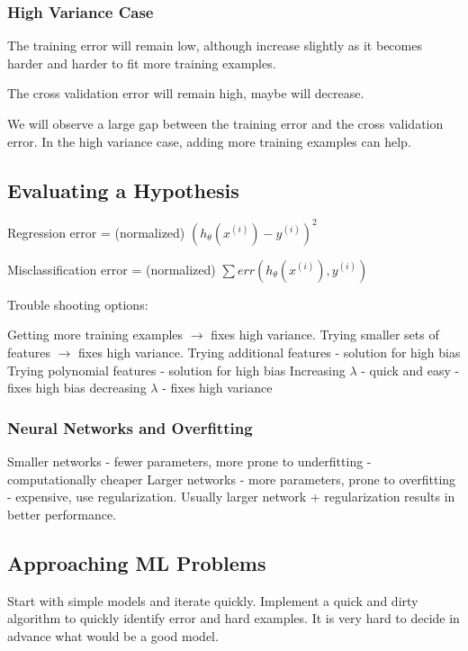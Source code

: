 \subsubsection{High Variance Case}

The training error will remain low, although increase slightly as it becomes harder and harder to fit more training examples.

The cross validation error will remain high, maybe will decrease.

We will observe a large gap between the training error and the cross validation error. In the high variance case, adding more training examples can help.

\subsection{Evaluating a Hypothesis}

Regression error = (normalized) $(h_\theta(x^(i)) - y^{(i)})^2$

Misclassification error = (normalized) $\sum err (h_\theta(x^{(i)}), y^{(i)})$

Trouble shooting options:

Getting more training examples $\rightarrow$ fixes high variance.
Trying smaller sets of features $\rightarrow$ fixes high variance.
Trying additional features - solution for high bias
Trying polynomial features - solution for high bias
Increasing $\lambda$ - quick and easy - fixes high bias
decreasing $\lambda$ - fixes high variance

\subsubsection{Neural Networks and Overfitting}

Smaller networks - fewer parameters, more prone to underfitting - computationally cheaper
Larger networks - more parameters, prone to overfitting - expensive, use regularization. 
Usually larger network + regularization results in better performance.


\subsection{Approaching ML Problems}

Start with simple models and iterate quickly. 
Implement a quick and dirty algorithm to quickly identify error and hard examples.
It is very hard to decide in advance what would be a good model.

